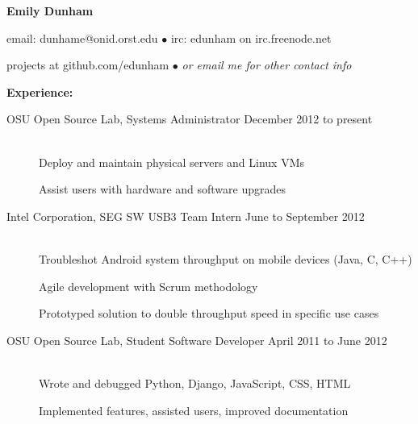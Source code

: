 \documentclass[11pt]{article}
\begin{document}
\centerline{{\LARGE \bf Emily Dunham}}

\bigskip

\centerline{email: dunhame@onid.orst.edu
        $\bullet$
        irc: edunham on irc.freenode.net}
\centerline{projects at github.com/edunham
        $\bullet$
        \emph{or email me for other contact info}}

\bigskip
\hrulefill
\bigskip

{\Large \bf Experience:}
\begin{description}
\item[OSU Open Source Lab, Systems Administrator
    \hfill December 2012 to present]
    \hfill \\
    Deploy and maintain physical servers and Linux VMs

    Assist users with hardware and software upgrades

\item[Intel Corporation, SEG SW USB3 Team Intern
    \hfill June to September 2012]
    \hfill \\
    Troubleshot Android system throughput on mobile devices (Java, C, C++)

    Agile development with Scrum methodology

    Prototyped solution to double throughput speed in specific use cases

\item[OSU Open Source Lab, Student Software Developer
    \hfill April 2011 to June 2012]
    \hfill \\
    Wrote and debugged Python, Django, JavaScript, CSS, HTML

    Implemented features, assisted users, improved documentation
\end{description}

\smallskip
\hrulefill
\bigskip
\end{document}
